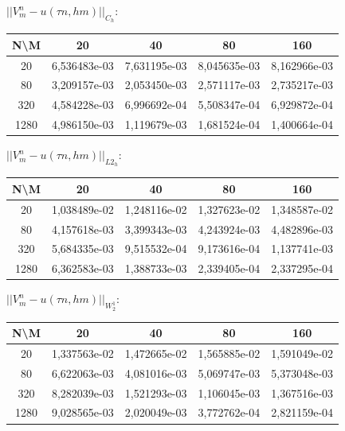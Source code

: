 \documentclass[a4paper, 11pt]{article}
\begin{document}
$||V_m^n - u (\tau n, hm)||_{C_h}$:
\begin{center}
\begin{tabular}{|c|c|c|c|c|}
\hline 
 N\textbackslash M &      20      &      40      &      80      &     160      \\ 
 \hline 
        20         & 6,536483e-03 & 7,631195e-03 & 8,045635e-03 & 8,162966e-03 \\ 
 \hline 
        80         & 3,209157e-03 & 2,053450e-03 & 2,571117e-03 & 2,735217e-03 \\ 
 \hline 
        320        & 4,584228e-03 & 6,996692e-04 & 5,508347e-04 & 6,929872e-04 \\ 
 \hline 
       1280        & 4,986150e-03 & 1,119679e-03 & 1,681524e-04 & 1,400664e-04 \\ 
 \hline 
\end{tabular}
\end{center}
$||V_m^n - u (\tau n, hm)||_{L2_h}$:
\begin{center}
\begin{tabular}{|c|c|c|c|c|}
\hline 
 N\textbackslash M &      20      &      40      &      80      &     160      \\ 
 \hline 
        20         & 1,038489e-02 & 1,248116e-02 & 1,327623e-02 & 1,348587e-02 \\ 
 \hline 
        80         & 4,157618e-03 & 3,399343e-03 & 4,243924e-03 & 4,482896e-03 \\ 
 \hline 
        320        & 5,684335e-03 & 9,515532e-04 & 9,173616e-04 & 1,137741e-03 \\ 
 \hline 
       1280        & 6,362583e-03 & 1,388733e-03 & 2,339405e-04 & 2,337295e-04 \\ 
 \hline 
\end{tabular}
\end{center}
$||V_m^n - u (\tau n, hm)||_{W_2^1}$:
\begin{center}
\begin{tabular}{|c|c|c|c|c|}
\hline 
 N\textbackslash M &      20      &      40      &      80      &     160      \\ 
 \hline 
        20         & 1,337563e-02 & 1,472665e-02 & 1,565885e-02 & 1,591049e-02 \\ 
 \hline 
        80         & 6,622063e-03 & 4,081016e-03 & 5,069747e-03 & 5,373048e-03 \\ 
 \hline 
        320        & 8,282039e-03 & 1,521293e-03 & 1,106045e-03 & 1,367516e-03 \\ 
 \hline 
       1280        & 9,028565e-03 & 2,020049e-03 & 3,772762e-04 & 2,821159e-04 \\ 
 \hline 
\end{tabular}
\end{center}
\end{document}
